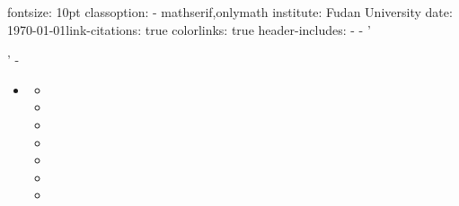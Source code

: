 \documentclass[
  ignorenonframetext,
]{beamer}
\begin{document}
\begin{frame}
fontsize: 10pt classoption: - mathserif,onlymath institute: Fudan
University date: \today link-citations: true colorlinks: true
header-includes: -  - '\ifxetex 

\usepackage[UTF8]{ctex}

\fi' -

\usepackage[footnotesize]{subfigure}

\begin{itemize}
\item
  \usepackage{tikz,pgf,pgfplots}

  \begin{itemize}
  \item
    \usetikzlibrary{arrows}
  \item
  \item
    \newcommand{\columnsbegin}{\begin{columns}}
  \item
    \newcommand{\columnsend}{\end{columns}}
  \item
    \newcommand{\col}[1]{\column{#1}}
  \item
  \item
  \end{itemize}
\end{itemize}
\end{frame}
\end{document}
